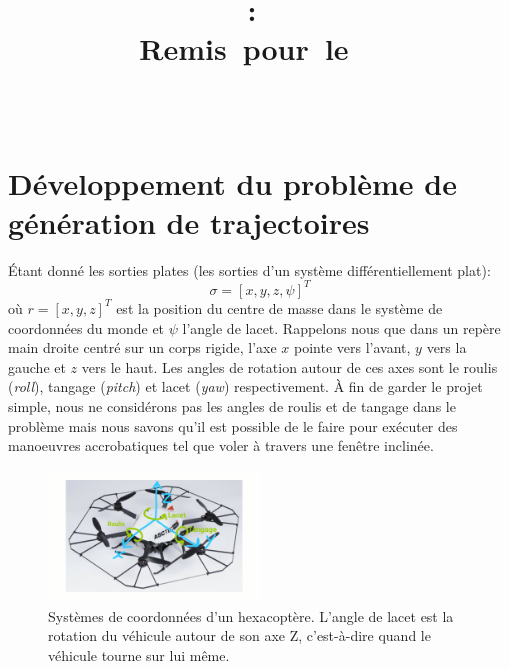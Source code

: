 \documentclass{article}
\title{
    \vspace{2in}
    \textmd{\textbf{\hmwkClass:\ \hmwkTitle}}\\
    \normalsize\vspace{0.1in}\small{Remis\ pour\ le\ \hmwkDueDate\ }\\
    \vspace{0.1in}\large{\textit{\hmwkClassInstructor\ \hmwkClassTime}}
    \vspace{3in}
}
\author{\textbf{\hmwkAuthorName}}
\date{}
\begin{document}
\maketitle

\pagebreak


\section{Développement du problème de génération de trajectoires}
Étant donné les sorties plates (les sorties d'un système différentiellement plat):
\begin{equation}
\sigma = [x, y, z, \psi]^T
\end{equation}
où $r = [x, y, z]^T$ est la position du centre de masse dans le système de coordonnées du monde et $\psi$ l'angle de lacet. Rappelons nous que dans un repère main droite centré sur un corps rigide, l'axe $x$ pointe vers l'avant, $y$ vers la gauche et $z$ vers le haut. Les angles de rotation autour de ces axes sont le roulis (\textit{roll}), tangage (\textit{pitch}) et lacet (\textit{yaw}) respectivement. À fin de garder le projet simple, nous ne considérons pas les angles de roulis et de tangage dans le problème mais nous savons qu'il est possible de le faire pour exécuter des manoeuvres accrobatiques tel que voler à travers une fenêtre inclinée.

\begin{figure}[h]
	\centering
	\includegraphics[width=0.5\textwidth]{fig/firefly.png}
	\caption{Systèmes de coordonnées d'un hexacoptère. L'angle de lacet est la rotation du véhicule autour de son axe Z, c'est-à-dire quand le véhicule tourne sur lui même.}
\end{figure}
\end{document}
